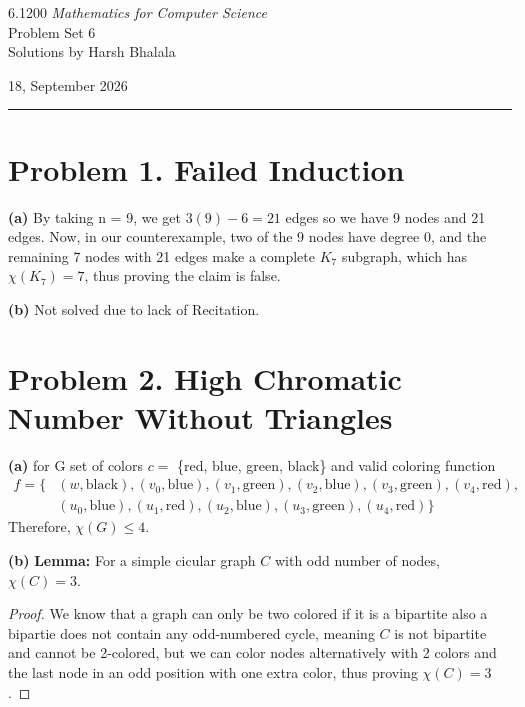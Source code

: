 \documentclass{article}
\begin{document}
\noindent
\begin{minipage}[t]{0.68\textwidth}
{\large 6.1200 \textit{Mathematics for Computer Science}}\\[4pt]
{\large Problem Set 6}\\[4pt]
{\large Solutions by Harsh Bhalala}
\end{minipage}%
\hfill
\begin{minipage}[t]{0.27\textwidth}
\raggedleft
{\large 18, September 2026}
\end{minipage}

\vspace{6pt}

\noindent\rule{\textwidth}{0.5pt}

\section*{Problem 1. Failed Induction}
\textbf{(a)}
    By taking n = 9, we get $3(9) - 6 = 21$ edges so we have 9 nodes and 21 edges.
    Now, in our counterexample, two of the 9 nodes have degree 0, and the remaining 7 nodes with 21 edges make
    a complete $K_7$ subgraph, which has $\chi(K_7) = 7$, thus proving the claim is false.

\vspace{\baselineskip}
\noindent\textbf{(b)} Not solved due to lack of Recitation.

\section*{Problem 2. High Chromatic Number Without Triangles}

\textbf{(a)}
    for G set of colors $c = $ \{red, blue, green, black\} and valid coloring function
    \[
    \begin{aligned}
    f = \{ &(w,\text{black}), (v_0,\text{blue}), (v_1,\text{green}), (v_2,\text{blue}), (v_3,\text{green}), (v_4,\text{red}),\\
    &(u_0,\text{blue}), (u_1,\text{red}), (u_2,\text{blue}), (u_3,\text{green}), (u_4,\text{red})
    \}
    \end{aligned}
    \]
Therefore, $\chi(G) \leq 4$.

\vspace{\baselineskip}
\noindent\textbf{(b)} \textbf{Lemma:} For a simple cicular graph $C$ with odd number of nodes, $\chi(C) = 3$.
\begin{proof}
    We know that a graph can only be two colored if it is a bipartite also a bipartie does not contain any
    odd-numbered cycle, meaning $C$ is not bipartite and cannot be 2-colored, but we can color nodes alternatively with
    2 colors and the last node in an odd position with one extra color, thus proving $\chi(C) = 3$.
\end{proof}
\end{document}
